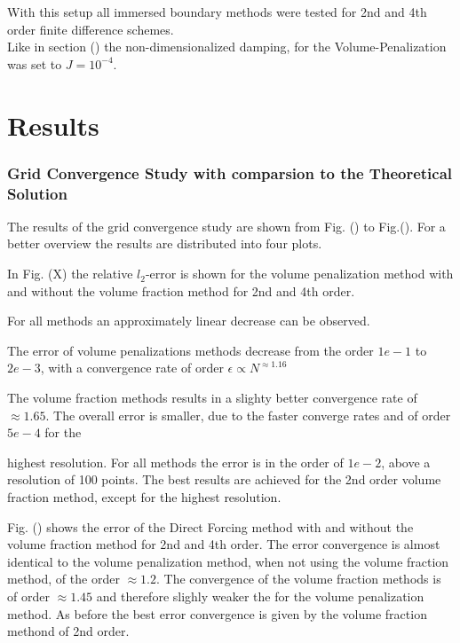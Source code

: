 With this setup all immersed boundary methods were tested for 2nd and 4th order finite difference schemes.\\
Like in section () the non-dimensionalized damping, for the Volume-Penalization was set to $J=10^{-4}$.

\clearpage

\section{Results}

\subsubsection{Grid Convergence Study with comparsion to the Theoretical Solution}

The results of the grid convergence study are shown from Fig. () to Fig.().
For a better overview the results are distributed into four plots.

In Fig. (X) the relative $l_2$-error is shown for the volume penalization method with and without the volume fraction method
for 2nd and 4th order.

For all methods an approximately linear decrease  can be observed.

The error of volume penalizations methods decrease from the order $1e-1$ to $2e-3$, with
a convergence rate of order  $\epsilon \propto N^{\approx1.16}$

The volume fraction methods results in a slighty better convergence rate of $\approx 1.65$.
The overall error is smaller, due to the faster converge rates and of order $5e-4$ for the

highest resolution. For all methods the error is in the order of $1e-2$, above a resolution of 100 points.
The best results are achieved for the 2nd order volume fraction method, except for the highest resolution.

Fig. () shows the error of the Direct Forcing method with and without the volume fraction method for 2nd
and 4th order. The error convergence is almost identical to the volume penalization method, when not using the volume
fraction method, of the order $\approx 1.2$. The convergence of the volume fraction methods is of order $\approx 1.45$
and therefore slighly weaker the for the volume penalization method.
As before the best error convergence is given by the volume fraction methond of 2nd order.

